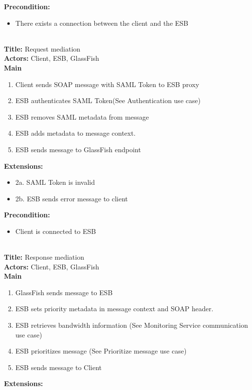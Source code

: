     \textbf{Precondition:}
    \begin{itemize}
        \item There exists a connection between the client and the ESB
    \end{itemize}
    \\
    \textbf{Title:} Request mediation\\
    \textbf{Actors:} Client, ESB, GlassFish\\
    \textbf{Main}
    \begin{enumerate}
        \item Client sends SOAP message with SAML Token to ESB proxy
        \item ESB authenticates SAML Token(See Authentication use case)
        \item ESB removes SAML metadata from message
        \item ESB adds metadata to message context.
        \item ESB sends message to GlassFish endpoint
    \end{enumerate}
    \textbf{Extensions:}
    \begin{itemize}
        \item[] 2a. SAML Token is invalid
        \item[] 2b. ESB sends error message to client
    \end{itemize}
    \textbf{Precondition:}
    \begin{itemize}
        \item Client is connected to ESB
    \end{itemize}
    \\
    \textbf{Title:} Response mediation \\
    \textbf{Actors:} Client, ESB, GlassFish \\
    \textbf{Main}
    \begin{enumerate}
        \item GlassFish sends message to ESB
        \item ESB sets priority metadata in message context and SOAP header.
        \item ESB retrieves bandwidth information (See Monitoring Service communication use case)
        \item ESB prioritizes message (See Prioritize message use case)
        \item ESB sends message to Client
    \end{enumerate}
    \textbf{Extensions:} \\
